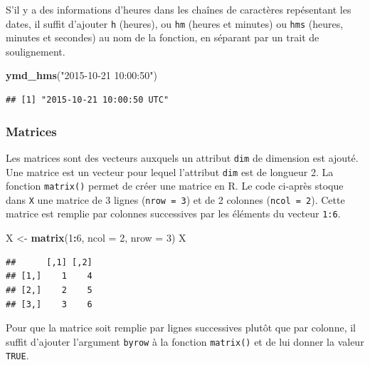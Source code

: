 \documentclass[
  11pt,
]{book}
\newenvironment{Shaded}{\begin{snugshade}}{\end{snugshade}}
\newcommand{\DataTypeTok}[1]{\textcolor[rgb]{0.13,0.29,0.53}{#1}}
\newcommand{\DecValTok}[1]{\textcolor[rgb]{0.00,0.00,0.81}{#1}}
\newcommand{\KeywordTok}[1]{\textcolor[rgb]{0.13,0.29,0.53}{\textbf{#1}}}
\newcommand{\NormalTok}[1]{#1}
\newcommand{\OperatorTok}[1]{\textcolor[rgb]{0.81,0.36,0.00}{\textbf{#1}}}
\newcommand{\StringTok}[1]{\textcolor[rgb]{0.31,0.60,0.02}{#1}}
\numberwithin{equation}{section}
\numberwithin{countremarque}{section}
\begin{document}
S'il y a des informations d'heures dans les chaînes de caractères repésentant les dates, il suffit d'ajouter \texttt{h} (heures), ou \texttt{hm} (heures et minutes) ou \texttt{hms} (heures, minutes et secondes) au nom de la fonction, en séparant par un trait de soulignement.

\begin{Shaded}
\begin{Highlighting}[]
\KeywordTok{ymd\_hms}\NormalTok{(}\StringTok{"2015{-}10{-}21 10:00:50"}\NormalTok{)}
\end{Highlighting}
\end{Shaded}

\begin{lstlisting}
## [1] "2015-10-21 10:00:50 UTC"
\end{lstlisting}

\hypertarget{structures-base-matrices}{%
\subsubsection{Matrices}\label{structures-base-matrices}}

Les matrices sont des vecteurs auxquels un attribut \texttt{dim} de dimension est ajouté. Une matrice est un vecteur pour lequel l'attribut \texttt{dim} est de longueur 2. La fonction \texttt{matrix()} permet de créer une matrice en R. Le code ci-après stoque dans \texttt{X} une matrice de 3 lignes (\texttt{nrow\ =\ 3}) et de 2 colonnes (\texttt{ncol\ =\ 2}). Cette matrice est remplie par colonnes successives par les éléments du vecteur \texttt{1:6}.

\begin{Shaded}
\begin{Highlighting}[]
\NormalTok{X \textless{}{-}}\StringTok{ }\KeywordTok{matrix}\NormalTok{(}\DecValTok{1}\OperatorTok{:}\DecValTok{6}\NormalTok{, }\DataTypeTok{ncol =} \DecValTok{2}\NormalTok{, }\DataTypeTok{nrow =} \DecValTok{3}\NormalTok{)}
\NormalTok{X}
\end{Highlighting}
\end{Shaded}

\begin{lstlisting}
##      [,1] [,2]
## [1,]    1    4
## [2,]    2    5
## [3,]    3    6
\end{lstlisting}

Pour que la matrice soit remplie par lignes successives plutôt que par colonne, il suffit d'ajouter l'argument \texttt{byrow} à la fonction \texttt{matrix()} et de lui donner la valeur \texttt{TRUE}.
\end{document}

